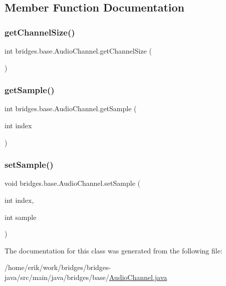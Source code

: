 \subsection{Member Function Documentation}
\mbox{\label{classbridges_1_1base_1_1_audio_channel_af367155c1e380bc7e934af74e74b0ef7}} 
\subsubsection{\texorpdfstring{get\+Channel\+Size()}{getChannelSize()}}
{\footnotesize\ttfamily int bridges.\+base.\+Audio\+Channel.\+get\+Channel\+Size (\begin{DoxyParamCaption}{ }\end{DoxyParamCaption})}

\mbox{\label{classbridges_1_1base_1_1_audio_channel_a62b3fdc6e9e03996f15216d5f7f2d3fb}} 
\subsubsection{\texorpdfstring{get\+Sample()}{getSample()}}
{\footnotesize\ttfamily int bridges.\+base.\+Audio\+Channel.\+get\+Sample (\begin{DoxyParamCaption}\item[{int}]{index }\end{DoxyParamCaption})}

\mbox{\label{classbridges_1_1base_1_1_audio_channel_aea69a2dab1bb9cc8c930f476b8392fd9}} 
\subsubsection{\texorpdfstring{set\+Sample()}{setSample()}}
{\footnotesize\ttfamily void bridges.\+base.\+Audio\+Channel.\+set\+Sample (\begin{DoxyParamCaption}\item[{int}]{index,  }\item[{int}]{sample }\end{DoxyParamCaption})}



The documentation for this class was generated from the following file\+:\begin{DoxyCompactItemize}
\item 
/home/erik/work/bridges/bridges-\/java/src/main/java/bridges/base/\hyperlink{_audio_channel_8java}{Audio\+Channel.\+java}\end{DoxyCompactItemize}
